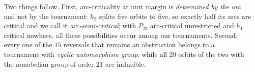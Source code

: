 \documentclass[
]{article}
\begin{document}
Two things follow. First, arc-criticality at unit margin is
\emph{determined by the arc} and not by the tournament: \(h_2\) splits
five orbits to five, so exactly half its arcs are critical and we call
it \emph{arc-semi-critical}; with \(P_{23}\) arc-critical unrestricted
and \(h_1\) critical nowhere, all three possibilities occur among our
tournaments. Second, every one of the \(15\) reversals that remains an
obstruction belongs to a tournament with \emph{cyclic automorphism
group}, while all \(20\) orbits of the two with the nonabelian group of
order \(21\) are inducible.
\end{document}
